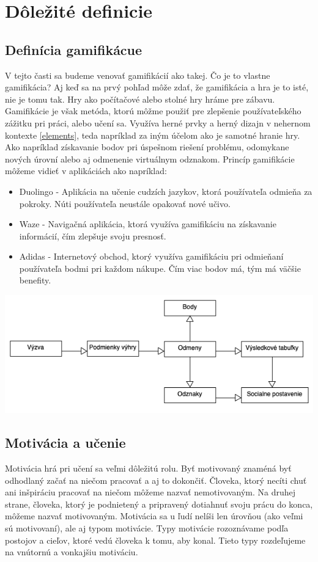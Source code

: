 \documentclass[10pt,oneside,slovak,a4paper]{article}
\begin{document}
\section{Dôležité definicie} \label{definicie}
\subsection{Definícia gamifikácue} \label{gamifikacia}
V tejto časti sa budeme venovať gamifikácií ako takej. Čo je to vlastne gamifikácia? Aj keď sa na prvý pohľad môže zdať, že gamifikácia a hra je to isté, nie je tomu tak. Hry ako počítačové alebo stolné hry hráme pre zábavu. Gamifikácie je však metóda, ktorú môžme použiť pre zlepšenie používateľského zážitku pri práci, alebo učení sa. Využíva herné prvky a herný dizajn v nehernom kontexte \ref{elements}, teda napríklad za iným účelom ako je samotné hranie hry. Ako napríklad získavanie bodov pri úspešnom riešení problému, odomykane nových úrovní alebo aj odmenenie virtuálnym odznakom. Princíp gamifikácie môžeme vidieť v aplikáciách ako napríklad:


\begin{itemize}
    \item Duolingo - Aplikácia na učenie cudzích jazykov, ktorá používateľa odmieňa za pokroky. Núti používateľa neustále opakovať nové učivo.
    \item Waze - Navigačná aplikácia, ktorá využíva gamifikáciu na získavanie informácií, čím zlepšuje svoju presnosť.
    \item Adidas - Internetový obchod, ktorý využíva gamifikáciu pri odmieňaní používateľa bodmi pri každom nákupe. Čím viac bodov má, tým má väčšie benefity.
\end{itemize}
\begin{center}
    \includegraphics[scale = 0.5]{diagram.png}

\end{center}


\subsection{Motivácia a učenie} \label{motivacia}
Motivácia hrá pri učení sa veľmi dôležitú rolu. Byť motivovaný znaméná byť odhodlaný začať na niečom pracovať a aj to dokončiť. Človeka, ktorý necíti chuť ani inšpiráciu pracovať na niečom môžeme nazvať nemotivovaným. Na druhej strane, človeka, ktorý je podnietený a pripravený dotiahnuť svoju prácu do konca, môžeme nazvať motivovaným. Motivácia sa u ľudí nelíši len úrovňou (ako veľmi sú motivovaní), ale aj typom motivácie. Typy motivácie rozoznávame podľa postojov a cieľov, ktoré vedú človeka k tomu, aby konal. Tieto typy rozdeľujeme na vnútornú a vonkajšiu motiváciu. ~\cite{ryan2000intrinsic}
\end{document}
